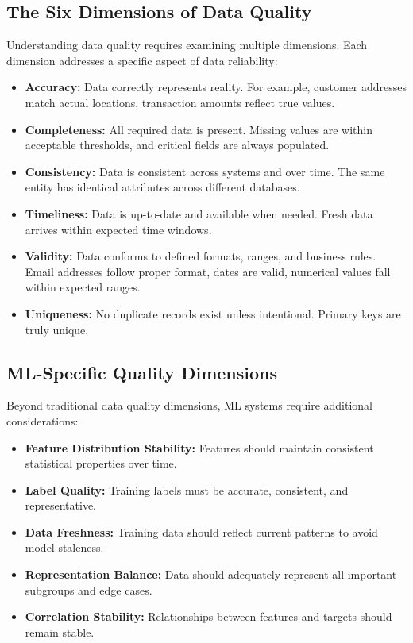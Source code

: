 \subsection{The Six Dimensions of Data Quality}

Understanding data quality requires examining multiple dimensions. Each dimension addresses a specific aspect of data reliability:

\begin{itemize}
    \item \textbf{Accuracy:} Data correctly represents reality. For example, customer addresses match actual locations, transaction amounts reflect true values.

    \item \textbf{Completeness:} All required data is present. Missing values are within acceptable thresholds, and critical fields are always populated.

    \item \textbf{Consistency:} Data is consistent across systems and over time. The same entity has identical attributes across different databases.

    \item \textbf{Timeliness:} Data is up-to-date and available when needed. Fresh data arrives within expected time windows.

    \item \textbf{Validity:} Data conforms to defined formats, ranges, and business rules. Email addresses follow proper format, dates are valid, numerical values fall within expected ranges.

    \item \textbf{Uniqueness:} No duplicate records exist unless intentional. Primary keys are truly unique.
\end{itemize}

\subsection{ML-Specific Quality Dimensions}

Beyond traditional data quality dimensions, ML systems require additional considerations:

\begin{itemize}
    \item \textbf{Feature Distribution Stability:} Features should maintain consistent statistical properties over time.

    \item \textbf{Label Quality:} Training labels must be accurate, consistent, and representative.

    \item \textbf{Data Freshness:} Training data should reflect current patterns to avoid model staleness.

    \item \textbf{Representation Balance:} Data should adequately represent all important subgroups and edge cases.

    \item \textbf{Correlation Stability:} Relationships between features and targets should remain stable.
\end{itemize}

